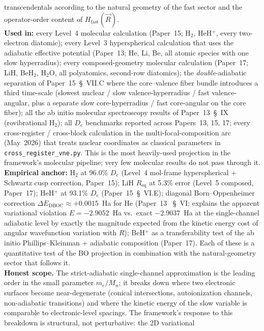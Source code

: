\documentclass[11pt]{article}
\begin{document}
transcendentals according to the natural geometry of the fast sector
and the operator-order content of $H_\text{fast}(\vec{R})$.\\
\textbf{Used in:} every Level~4 molecular calculation (Paper~15;
H$_2$, HeH$^+$, every two-electron diatomic); every Level~3
hyperspherical calculation that uses the adiabatic effective potential
(Paper~13; He, Li, Be, all atomic species with one slow
hyperradius); every composed-geometry molecular calculation
(Paper~17; LiH, BeH$_2$, H$_2$O, all polyatomics, second-row
diatomics); the \emph{double}-adiabatic separation of Paper~15~\S~VII.C
where the core--valence fiber bundle introduces a third time-scale
(slowest nuclear / slow valence-hyperradius / fast valence-angular,
plus a separate slow core-hyperradius / fast core-angular on the
core fiber); all the ab initio molecular spectroscopy results of
Paper~13~\S~IX (rovibrational H$_2$); all $D_e$ benchmarks reported
across Papers~13, 15, 17; every cross-register / cross-block
calculation in the multi-focal-composition arc (May~2026) that
treats nuclear coordinates as classical parameters in
\texttt{cross\_register\_vne.py}.  This is the most heavily-used
projection in the framework's molecular pipeline; very few molecular
results do not pass through it.\\
\textbf{Empirical anchor:} H$_2$ at 96.0\% $D_e$ (Level~4
mol-frame hyperspherical + Schwartz cusp correction, Paper~15);
LiH $R_\text{eq}$ at 5.3\% error (Level~5 composed, Paper~17);
HeH$^+$ at 93.1\% $D_e$ (Paper~15~\S~VI.E); diagonal Born--Oppenheimer
correction $\Delta E_\text{DBOC} \approx +0.0015$~Ha for He (Paper~13
~\S~VI; explains the apparent variational violation $E = -2.9052$~Ha
vs.\ exact $-2.9037$~Ha at the single-channel adiabatic level by
exactly the magnitude expected from the kinetic energy cost of
angular wavefunction variation with $R$); BeH$^+$ as a transferability
test of the ab initio Phillips--Kleinman + adiabatic composition
(Paper~17).  Each of these is a quantitative test of the BO projection
in combination with the natural-geometry sector that follows it.\\
\textbf{Honest scope.}  The strict-adiabatic single-channel
approximation is the leading order in the small parameter $m_e / M_n$;
it breaks down where two electronic surfaces become near-degenerate
(conical intersections, autoionization channels, non-adiabatic
transitions) and where the kinetic energy of the slow variable is
comparable to electronic-level spacings.  The framework's response to
this breakdown is structural, not perturbative: the 2D variational
\end{document}
